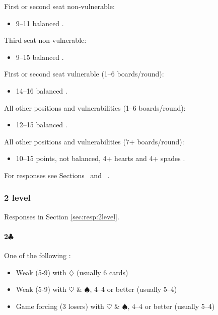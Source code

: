 \documentclass[a4paper,14pt]{extarticle}
\begin{document}
First or second seat non-vulnerable:
\begin{itemize}
\item 9--11 balanced .
\end{itemize}

Third seat non-vulnerable:
\begin{itemize}
\item 9--15 balanced .
\end{itemize}

First or second seat vulnerable (1--6 boards/round):
\begin{itemize}
\item 14--16 balanced .
\end{itemize}

All other positions and vulnerabilities (1--6 boards/round):
\begin{itemize}
\item 12--15 balanced .
\end{itemize}

All other positions and vulnerabilities (7+ boards/round):
\begin{itemize}
\item 10--15 points, not balanced, 4+ hearts and 4+ spades .
\end{itemize}

For responses see Sections~ and ~.

\newpage 

\subsubsection{2 level}
\label{sec:open:2level}

Responses in Section \ref{sec:resp:2level}.

\paragraph{2$\clubsuit$}
One of the following :
\begin{itemize}
\item Weak (5-9) with $\diamondsuit$ (usually 6 cards)
\item Weak (5-9) with $\heartsuit$ \& $\spadesuit$, 4--4 or better (usually 5--4)
\item Game forcing (3 losers) with $\heartsuit$ \& $\spadesuit$, 4--4 or better (usually 5--4)
\end{itemize}
\end{document}
